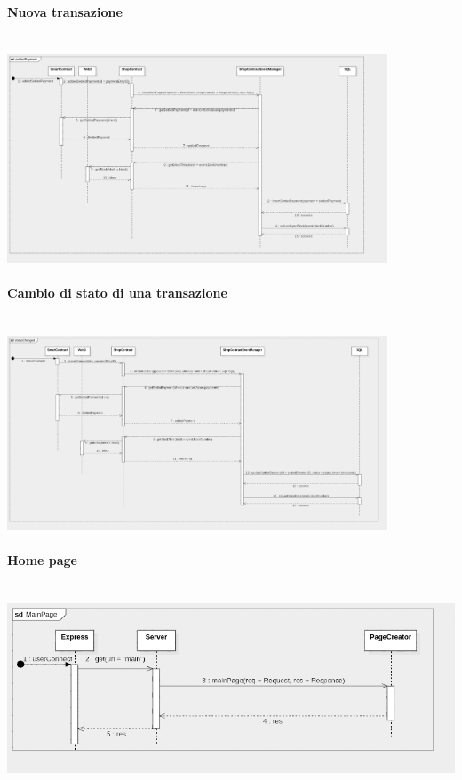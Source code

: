 \documentclass[a4paper, 12pt]{article}
\begin{document}
\paragraph{Nuova transazione}\\
\includegraphics[width=0.85\textwidth]{payment}

\paragraph{Cambio di stato di una transazione}\\
\includegraphics[width=0.85\textwidth]{status}

\paragraph{Home page}\\
\includegraphics[width=1.0\textwidth]{index}
\end{document}
